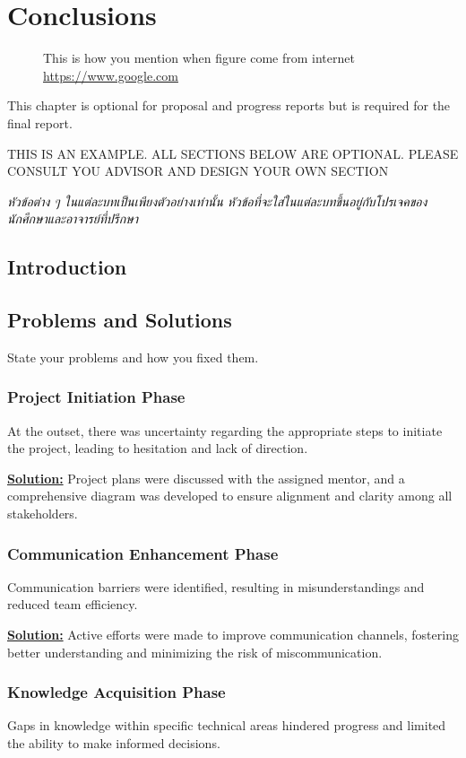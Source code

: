 \chapter{Conclusions}

 \begin{figure}[!h]
\caption{This is how you mention when figure come from internet  \href{https://www.google.com} {https://www.google.com}}\label{fig:x1}
\end{figure}

This chapter is optional for proposal and progress reports but 
is required for the final report.

THIS IS AN EXAMPLE. ALL SECTIONS BELOW ARE OPTIONAL. PLEASE CONSULT YOU ADVISOR AND DESIGN YOUR OWN SECTION

\emph{\textthai{หัวข้อต่าง ๆ ในแต่ละบทเป็นเพียงตัวอย่างเท่านั้น หัวข้อที่จะใส่ในแต่ละบทขึ้นอยู่กับโปรเจคของนักศึกษาและอาจารย์ที่ปรึกษา}}

\section{Introduction}
\section{Problems and Solutions}
State your problems and how you fixed them.
\subsection{Project Initiation Phase} At the outset, there was uncertainty regarding the appropriate steps to initiate the project, leading to hesitation and lack of direction. 

\underline{\textbf{Solution:}} Project plans were discussed with the assigned mentor, and a comprehensive diagram was developed to ensure alignment and clarity among all stakeholders.

\subsection{Communication Enhancement Phase} Communication barriers were identified, resulting in misunderstandings and reduced team efficiency. 

\underline{\textbf{Solution:}} Active efforts were made to improve communication channels, fostering better understanding and minimizing the risk of miscommunication.

\subsection{Knowledge Acquisition Phase} Gaps in knowledge within specific technical areas hindered progress and limited the ability to make informed decisions. 

